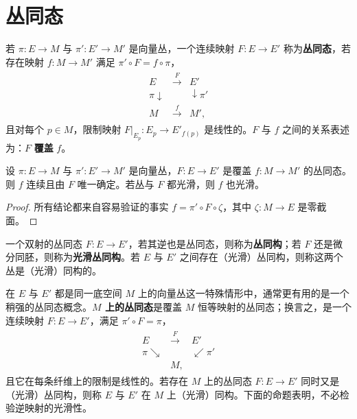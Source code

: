 \documentclass[../../main.tex]{subfiles}
\begin{document}
\section{丛同态}\label{section:ch10-丛同态}

若 $\pi\colon E\to M$ 与 $\pi'\colon E'\to M'$ 是向量丛，一个连续映射 $F\colon E\to E'$ 称为\textbf{丛同态}，若存在映射 $f\colon M\to M'$ 满足 $\pi'\circ F=f\circ\pi$，
\begin{align*}
\begin{array}{ccc}
E & \xrightarrow{F} & E'\\
\pi\downarrow && \downarrow\pi'\\
M & \xrightarrow{f} & M',
\end{array}
\end{align*}
且对每个 $p\in M$，限制映射 $F|_{E_p}\colon E_p\to E'_{f(p)}$ 是线性的。$F$ 与 $f$ 之间的关系表述为：$F$ \textbf{覆盖} $f$。

\begin{proposition}\label{proposition:ch10-丛同态覆盖映射}
设 $\pi\colon E\to M$ 与 $\pi'\colon E'\to M'$ 是向量丛，$F\colon E\to E'$ 是覆盖 $f\colon M\to M'$ 的丛同态。则 $f$ 连续且由 $F$ 唯一确定。若丛与 $F$ 都光滑，则 $f$ 也光滑。
\end{proposition}

\begin{proof}
所有结论都来自容易验证的事实 $f=\pi'\circ F\circ\zeta$，其中 $\zeta\colon M\to E$ 是零截面。
\end{proof}

一个双射的丛同态 $F\colon E\to E'$，若其逆也是丛同态，则称为\textbf{丛同构}；若 $F$ 还是微分同胚，则称为\textbf{光滑丛同构}。若 $E$ 与 $E'$ 之间存在（光滑）丛同构，则称这两个丛是（光滑）同构的。

在 $E$ 与 $E'$ 都是同一底空间 $M$ 上的向量丛这一特殊情形中，通常更有用的是一个稍强的丛同态概念。\textbf{$M$ 上的丛同态}是覆盖 $M$ 恒等映射的丛同态；换言之，是一个连续映射 $F\colon E\to E'$，满足 $\pi'\circ F=\pi$，
\begin{align*}
\begin{array}{ccc}
E & \xrightarrow{F} & E'\\
\pi\searrow && \swarrow\pi'\\
& M,
\end{array}
\end{align*}
且它在每条纤维上的限制是线性的。若存在 $M$ 上的丛同态 $F\colon E\to E'$ 同时又是（光滑）丛同构，则称 $E$ 与 $E'$ 在 $M$ 上（光滑）同构。下面的命题表明，不必检验逆映射的光滑性。
\end{document}
